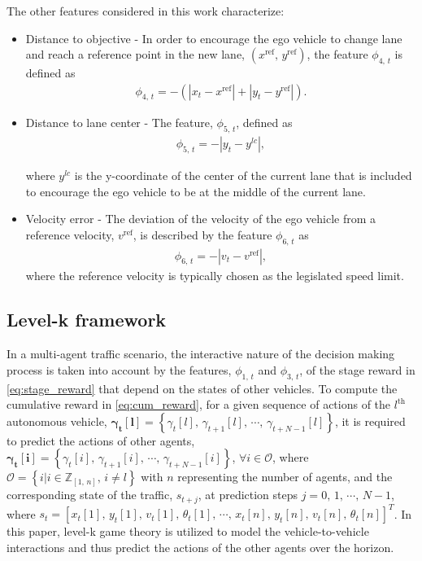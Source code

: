 \documentclass[10pt,journal]{IEEEtran}
\newcommand{\nth}[1]{$#1^{\textrm{th}}$}
\newcommand{\actseq}[1]{\boldsymbol{\gamma_{t}[#1]} = \left\{\gamma_{t}[#1],\,\gamma_{t+1}[#1],\,\cdots,\,\gamma_{t+N-1}[#1]\right\}}
\begin{document}
	The other features considered in this work characterize:
	\begin{itemize}
	 	\item Distance to objective - In order to encourage the ego vehicle to change lane and reach a reference point in the new lane, $\left(x^{\textrm{ref}},\,y^{\textrm{ref}}\right)$, the feature $\phi_{4,\,{t}} $ is defined as
	 	\begin{align}
	 		\phi_{4,\,{t}}  = -\left(\left|x_{t}-x^{\textrm{ref}}\right| + \left|y_{t}-y^{\textrm{ref}}\right|\right).
	 	\end{align}
	 	
	 	\item Distance to lane center - The feature, $\phi_{5,\,{t}} $, defined as 
	 	 \begin{align}
	 	 \phi_{5,\,{t}}  = - \left|y_{t}-y^{lc}\right|,
	 	 \end{align}
	 	 
	 	 \noindent where $y^{lc}$ is the y-coordinate of the center of the current lane that is included to encourage the ego vehicle to be at the middle of the current lane.
	 	 
	 	\item Velocity error - The deviation of the velocity of the ego vehicle from a reference velocity, $v^{\textrm{ref}}$, is described by the feature $\phi_{6,\,{t}}$ as
	 	\begin{align}
	 		\phi_{6,\,{t}} = - \left|v_{t}-v^{\textrm{ref}}\right|,
	 	\end{align}
	 	where the reference velocity is typically chosen as the legislated speed limit.
	\end{itemize}
 


 
 	\subsection{Level-k framework}
	\label{sec:level_k}

	In a multi-agent traffic scenario, the interactive nature of the decision making process is taken into account by the features, $\phi_{1,\,t}$ and $\phi_{3,\,t}$, of the stage reward in \eqref{eq:stage_reward} that depend on the states of other vehicles. To compute the cumulative reward in \eqref{eq:cum_reward}, for a given sequence of actions of the \nth{l} autonomous vehicle, $\actseq{l}$, it is required to predict the actions of other agents, $\actseq{i}$, $\forall i \in \mathcal{O}$, where $\mathcal{O}=\left\{i|i \in \mathbb{Z}_{\left[1,\,n\right]},\, i\neq l \right\}$ with $n$ representing the number of agents, and the corresponding state of the traffic, $s_{t+j}$,  at prediction steps $j=0,\,1,\,\cdots,\,N-1$, where $s_t = \left[x_t{\left[1\right]},\,y_t{\left[1\right]},\,v_t{\left[1\right]},\,\theta_t{\left[1\right]},\,\cdots,\,x_t{\left[n\right]},\,y_t{\left[n\right]},\,v_t{\left[n\right]},\,\theta_t{\left[n\right]}\right]^T$. In this paper, level-k game theory \cite{Costa-Gomes2006,Costa-Gomes2009} is utilized to model the vehicle-to-vehicle interactions and thus predict the actions of the other agents over the horizon.
\end{document}
